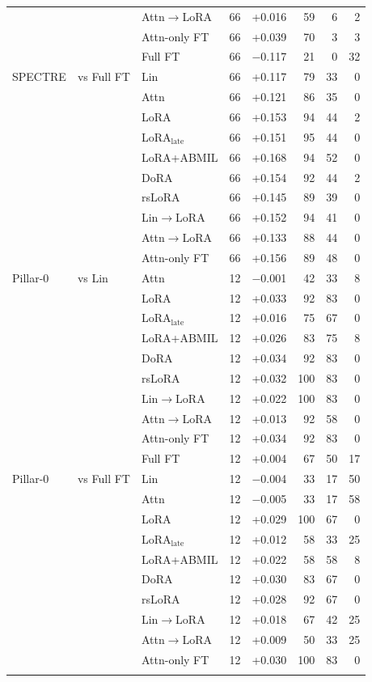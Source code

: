 \begin{tabular}{lllrrrrr}
 &  & Attn$\to$LoRA & 66 & +0.016 & 59 & 6 & 2 \\
 &  & Attn-only FT & 66 & +0.039 & 70 & 3 & 3 \\
 &  & Full FT & 66 & $-$0.117 & 21 & 0 & 32 \\
\addlinespace[2pt]
SPECTRE & vs Full FT & Lin & 66 & +0.117 & 79 & 33 & 0 \\
 &  & Attn & 66 & +0.121 & 86 & 35 & 0 \\
 &  & LoRA & 66 & +0.153 & 94 & 44 & 2 \\
 &  & LoRA$_{\text{late}}$ & 66 & +0.151 & 95 & 44 & 0 \\
 &  & LoRA+ABMIL & 66 & +0.168 & 94 & 52 & 0 \\
 &  & DoRA & 66 & +0.154 & 92 & 44 & 2 \\
 &  & rsLoRA & 66 & +0.145 & 89 & 39 & 0 \\
 &  & Lin$\to$LoRA & 66 & +0.152 & 94 & 41 & 0 \\
 &  & Attn$\to$LoRA & 66 & +0.133 & 88 & 44 & 0 \\
 &  & Attn-only FT & 66 & +0.156 & 89 & 48 & 0 \\
\addlinespace[2pt]
Pillar-0 & vs Lin & Attn & 12 & $-$0.001 & 42 & 33 & 8 \\
 &  & LoRA & 12 & +0.033 & 92 & 83 & 0 \\
 &  & LoRA$_{\text{late}}$ & 12 & +0.016 & 75 & 67 & 0 \\
 &  & LoRA+ABMIL & 12 & +0.026 & 83 & 75 & 8 \\
 &  & DoRA & 12 & +0.034 & 92 & 83 & 0 \\
 &  & rsLoRA & 12 & +0.032 & 100 & 83 & 0 \\
 &  & Lin$\to$LoRA & 12 & +0.022 & 100 & 83 & 0 \\
 &  & Attn$\to$LoRA & 12 & +0.013 & 92 & 58 & 0 \\
 &  & Attn-only FT & 12 & +0.034 & 92 & 83 & 0 \\
 &  & Full FT & 12 & +0.004 & 67 & 50 & 17 \\
\addlinespace[2pt]
Pillar-0 & vs Full FT & Lin & 12 & $-$0.004 & 33 & 17 & 50 \\
 &  & Attn & 12 & $-$0.005 & 33 & 17 & 58 \\
 &  & LoRA & 12 & +0.029 & 100 & 67 & 0 \\
 &  & LoRA$_{\text{late}}$ & 12 & +0.012 & 58 & 33 & 25 \\
 &  & LoRA+ABMIL & 12 & +0.022 & 58 & 58 & 8 \\
 &  & DoRA & 12 & +0.030 & 83 & 67 & 0 \\
 &  & rsLoRA & 12 & +0.028 & 92 & 67 & 0 \\
 &  & Lin$\to$LoRA & 12 & +0.018 & 67 & 42 & 25 \\
 &  & Attn$\to$LoRA & 12 & +0.009 & 50 & 33 & 25 \\
 &  & Attn-only FT & 12 & +0.030 & 100 & 83 & 0 \\
\addlinespace[2pt]
\bottomrule
\end{tabular}
